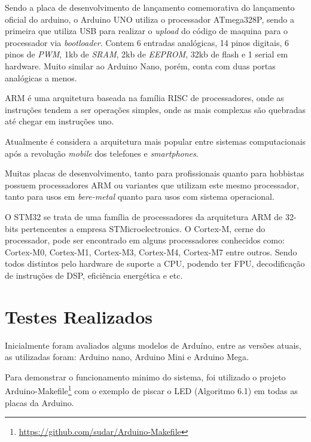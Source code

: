 Sendo a placa de desenvolvimento de lançamento comemorativa do lançamento oficial do arduino, o Arduino UNO utiliza o processador ATmega328P, sendo a primeira que utiliza USB para realizar o \textit{upload} do código de maquina para o processador via \textit{bootloader}. Contem 6 entradas analógicas, 14 pinos digitais, 6 pinos de \textit{PWM}, 1kb de \textit{SRAM}, 2kb de \textit{EEPROM}, 32kb de flash e 1 serial em hardware. Muito similar ao Arduino Nano, porém, conta com duas portas analógicas a menos.


ARM é uma arquitetura baseada na família RISC de processadores, onde as instruções tendem a ser operações simples, onde as mais complexas são quebradas até chegar em instruções uno.

Atualmente é considera a arquitetura mais popular entre sistemas computacionais após a revolução \textit{mobile} dos telefones e \textit{smartphones}.

Muitas placas de desenvolvimento, tanto para profissionais quanto para hobbistas possuem processadores ARM ou variantes que utilizam este mesmo processador, tanto para usos em \textit{bere-metal} quanto para usos com sistema operacional.


O STM32 se trata de uma família de processadores da arquitetura ARM de 32-bits pertencentes a empresa STMicroelectronics. O Cortex-M, cerne do processador, pode ser encontrado em alguns processadores conhecidos como: Cortex-M0, Cortex-M1, Cortex-M3, Cortex-M4, Cortex-M7 entre outros. Sendo todos distintos pelo hardware de suporte a CPU, podendo ter FPU, decodificação de instruções de DSP, eficiência energética e etc.


\section{Testes Realizados}

Inicialmente foram avaliados alguns modelos de Arduíno, entre as versões atuais, as utilizadas foram: Arduino nano, Arduino Mini e Arduino Mega.

Para demonstrar o funcionamento minimo do sistema, foi utilizado o projeto Arduino-Makefile\footnote{\url{https://github.com/sudar/Arduino-Makefile}} com o exemplo de piscar o LED (Algoritmo 6.1) em todas as placas da Arduino.

